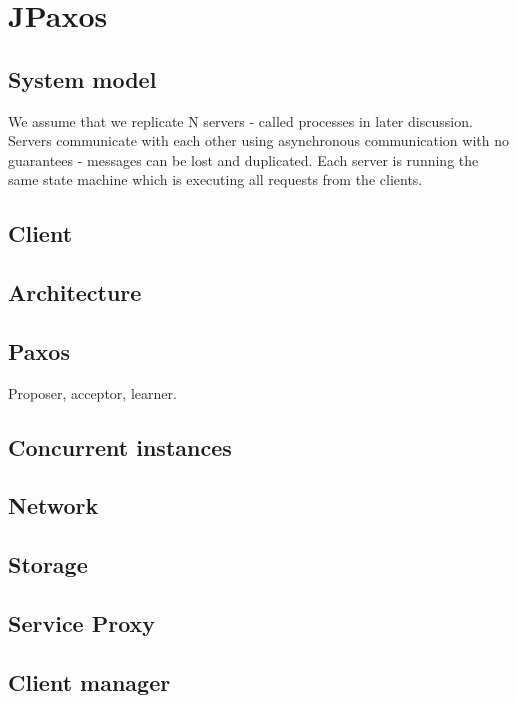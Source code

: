 
\chapter{JPaxos}

\section{System model}

We assume that we replicate N servers - called processes in later discussion.
Servers communicate with each other using asynchronous communication with no
guarantees - messages can be lost and duplicated. Each server is running the
same state machine which is executing all requests from the clients.

\section{Client}

\section{Architecture}

\section{Paxos}
Proposer, acceptor, learner.

\section{Concurrent instances}

\section{Network}
\label{sec:network}

\section{Storage}

\section{Service Proxy}
\label{sec:service-proxy}

\section{Client manager}
\label{sec:client-manager}

